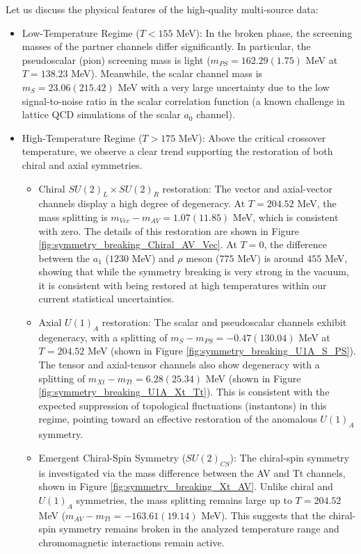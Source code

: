 Let us discuss the physical features of the high-quality multi-source data:
\begin{itemize}
    \item Low-Temperature Regime ($T < 155$ MeV): In the broken phase, the screening masses of the partner channels differ significantly. In particular, the pseudoscalar (pion) screening mass is light ($m_{PS} = 162.29(1.75)$ MeV at $T=138.23$ MeV). Meanwhile, the scalar channel mass is $m_S = 23.06(215.42)$ MeV with a very large uncertainty due to the low signal-to-noise ratio in the scalar correlation function (a known challenge in lattice QCD simulations of the scalar $a_0$ channel).
    \item High-Temperature Regime ($T > 175$ MeV): Above the critical crossover temperature, we observe a clear trend supporting the restoration of both chiral and axial symmetries.
    \begin{itemize}
        \item Chiral $SU(2)_L \times SU(2)_R$ restoration: The vector and axial-vector channels display a high degree of degeneracy. At $T = 204.52$ MeV, the mass splitting is $m_{Vec} - m_{AV} = 1.07(11.85)$ MeV, which is consistent with zero. The details of this restoration are shown in Figure \ref{fig:symmetry_breaking_Chiral_AV_Vec}. At $T=0$, the difference between the $a_1$ ($1230$ MeV) and $\rho$ meson ($775$ MeV) is around $455$ MeV, showing that while the symmetry breaking is very strong in the vacuum, it is consistent with being restored at high temperatures within our current statistical uncertainties.
        \item Axial $U(1)_A$ restoration: The scalar and pseudoscalar channels exhibit degeneracy, with a splitting of $m_S - m_{PS} = -0.47(130.04)$ MeV at $T = 204.52$ MeV (shown in Figure \ref{fig:symmetry_breaking_U1A_S_PS}). The tensor and axial-tensor channels also show degeneracy with a splitting of $m_{Xt} - m_{Tt} = 6.28(25.34)$ MeV (shown in Figure \ref{fig:symmetry_breaking_U1A_Xt_Tt}). This is consistent with the expected suppression of topological fluctuations (instantons) in this regime, pointing toward an effective restoration of the anomalous $U(1)_A$ symmetry.
        \item Emergent Chiral-Spin Symmetry ($SU(2)_{CS}$): The chiral-spin symmetry is investigated via the mass difference between the AV and Tt channels, shown in Figure \ref{fig:symmetry_breaking_Xt_AV}. Unlike chiral and $U(1)_A$ symmetries, the mass splitting remains large up to $T = 204.52$ MeV ($m_{AV} - m_{Tt} = -163.61(19.14)$ MeV). This suggests that the chiral-spin symmetry remains broken in the analyzed temperature range and chromomagnetic interactions remain active.
    \end{itemize}
\end{itemize}

